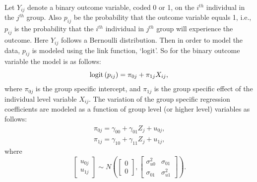 \documentclass[12pt,oneside,a4paper]{reedthesis}
\begin{document}
Let \(Y_{i j}\) denote a binary outcome variable, coded 0 or 1, on the \(i^{th}\) individual in the \(j^{th}\) group. Also \(p_{i j}\) be the probability that the outcome variable equals 1, i.e., \(p_{i j}\) is the probability that the \(i^{th}\) individual in \(j^{th}\) group will experience the outcome. Here \(Y_{i j}\) follows a Bernoulli distribution. Then in order to model the data, \(p_{i j}\) is modeled using the link function, `logit'.
So for the binary outcome variable the model is as follows:
\begin{equation} 
{\operatorname{logit}\left(p_{i j}\right)=\pi_{0 j}+\pi_{1 j} X_{i j}}, \\
\label{eq:logistic-model}
\end{equation}
where \(\pi_{0 j}\) is the group specific intercept, and \(\pi_{1 j}\) is the group specific effect of the individual level variable \(X_{i j}\).
The variation of the group specific regression coefficients are modeled as a function of group level (or higher level) variables as follows:
\begin{equation} 
\begin{array}{l}
{\pi_{0 j}=\gamma_{00}+\gamma_{01} Z_{j}+u_{0 j}}, \\
{\pi_{1 j}=\gamma_{10}+\gamma_{11} Z_{j}+u_{1 j}},
\end{array}
\end{equation}
where
\[
\left[\begin{array}{l}{u_{0 j}} \\
{u_{1 j}}\end{array}\right] \sim N\left(\left[\begin{array}{l}{0} \\
{0}\end{array}\right],\left[\begin{array}{cc}{\sigma_{u0}^{2}} & {\sigma_{01}} \\ {\sigma_{01}} & {\sigma_{u1}^{2}}\end{array}\right]\right).
\]
\end{document}
